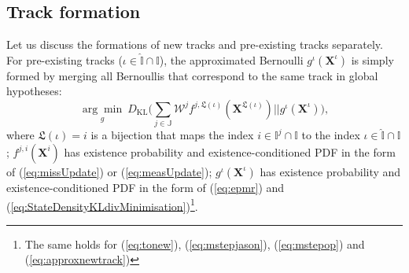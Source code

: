 \documentclass[journal]{IEEEtran}
\begin{document}
\subsection{Track formation}
Let us discuss the formations of new tracks and pre-existing tracks separately. For pre-existing tracks ($\iota\in\hat{\mathbb{I}}\cap\mathbb{I}$), the approximated Bernoulli $g^{\iota}(\mathbf{X}^{\iota})$ is simply formed by merging all Bernoullis that correspond to the same track in global hypotheses:
\begin{equation}
    \underset{g}{\arg\min}~D_{\text{KL}} \bigg(  \sum_{j\in\mathbb{J}}\mathcal{W}^jf^{j,\mathfrak{L}(\iota)}(\mathbf{X}^{\mathfrak{L}(\iota)}) ||g^{\iota}(\mathbf{X}^{\iota}) \bigg),
    \label{eq:tomerge}
\end{equation}
where $\mathfrak{L}(\iota)=i$ is a bijection that maps the index $i\in\mathbb{I}^j\cap\mathbb{I}$ to the index $\iota\in\hat{\mathbb{I}}\cap\mathbb{I}$; $f^{j,i}(\mathbf{X}^i)$ has existence probability and existence-conditioned PDF in the form of (\ref{eq:missUpdate}) or (\ref{eq:measUpdate}); $g^{\iota}(\mathbf{X}^{\iota})$ has existence probability and existence-conditioned PDF in the form of (\ref{eq:epmr}) and (\ref{eq:StateDensityKLdivMinimisation})\footnote{The same holds for (\ref{eq:tonew}), (\ref{eq:mstepjason}), (\ref{eq:mstepop}) and (\ref{eq:approxnewtrack})}.


\end{document}
